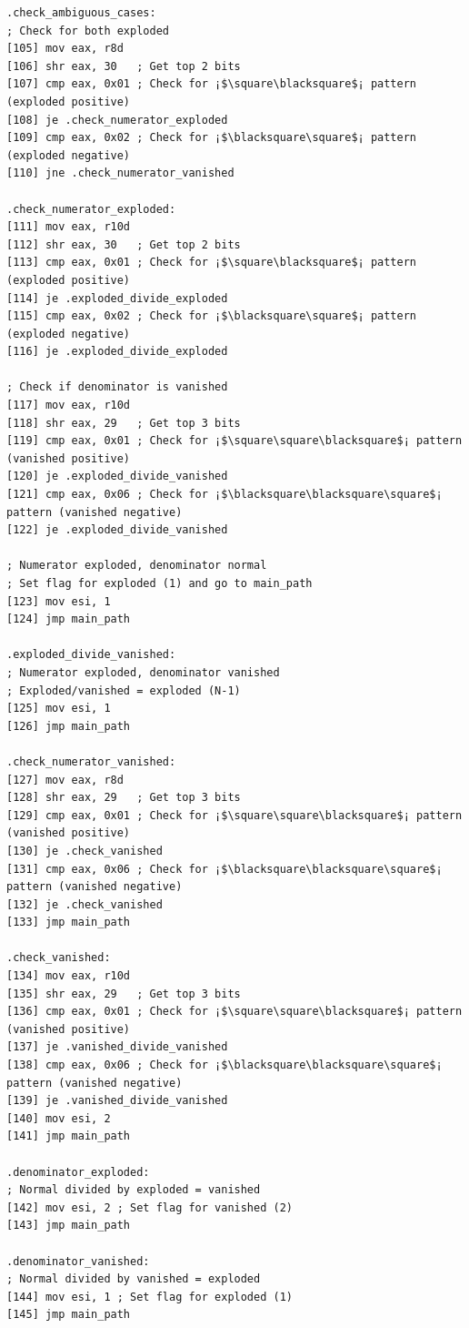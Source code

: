 \documentclass[12pt,letter]{article}
\begin{document}
\begin{lstlisting}[style=rust, caption={Complete Complex Division Assembly Implementation}, label={fig:circle_divide}]
.check_ambiguous_cases:
; Check for both exploded
[105] mov eax, r8d
[106] shr eax, 30   ; Get top 2 bits
[107] cmp eax, 0x01 ; Check for ¡$\square\blacksquare$¡ pattern (exploded positive)
[108] je .check_numerator_exploded
[109] cmp eax, 0x02 ; Check for ¡$\blacksquare\square$¡ pattern (exploded negative)
[110] jne .check_numerator_vanished

.check_numerator_exploded:
[111] mov eax, r10d
[112] shr eax, 30   ; Get top 2 bits
[113] cmp eax, 0x01 ; Check for ¡$\square\blacksquare$¡ pattern (exploded positive)
[114] je .exploded_divide_exploded
[115] cmp eax, 0x02 ; Check for ¡$\blacksquare\square$¡ pattern (exploded negative)
[116] je .exploded_divide_exploded

; Check if denominator is vanished
[117] mov eax, r10d
[118] shr eax, 29   ; Get top 3 bits
[119] cmp eax, 0x01 ; Check for ¡$\square\square\blacksquare$¡ pattern (vanished positive)
[120] je .exploded_divide_vanished
[121] cmp eax, 0x06 ; Check for ¡$\blacksquare\blacksquare\square$¡ pattern (vanished negative)
[122] je .exploded_divide_vanished

; Numerator exploded, denominator normal
; Set flag for exploded (1) and go to main_path
[123] mov esi, 1
[124] jmp main_path

.exploded_divide_vanished:
; Numerator exploded, denominator vanished
; Exploded/vanished = exploded (N-1)
[125] mov esi, 1
[126] jmp main_path

.check_numerator_vanished:
[127] mov eax, r8d
[128] shr eax, 29   ; Get top 3 bits
[129] cmp eax, 0x01 ; Check for ¡$\square\square\blacksquare$¡ pattern (vanished positive)
[130] je .check_vanished
[131] cmp eax, 0x06 ; Check for ¡$\blacksquare\blacksquare\square$¡ pattern (vanished negative)
[132] je .check_vanished
[133] jmp main_path

.check_vanished:
[134] mov eax, r10d
[135] shr eax, 29   ; Get top 3 bits
[136] cmp eax, 0x01 ; Check for ¡$\square\square\blacksquare$¡ pattern (vanished positive)
[137] je .vanished_divide_vanished
[138] cmp eax, 0x06 ; Check for ¡$\blacksquare\blacksquare\square$¡ pattern (vanished negative)
[139] je .vanished_divide_vanished
[140] mov esi, 2
[141] jmp main_path

.denominator_exploded:
; Normal divided by exploded = vanished
[142] mov esi, 2 ; Set flag for vanished (2)
[143] jmp main_path

.denominator_vanished:
; Normal divided by vanished = exploded
[144] mov esi, 1 ; Set flag for exploded (1)
[145] jmp main_path


\end{lstlisting}
\end{document}
